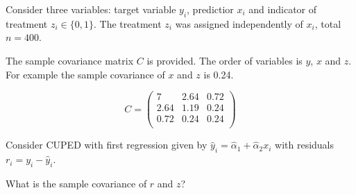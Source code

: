 
\begin{question}
Consider three variables: target variable \(y_i\), predictior \(x_i\) and indicator of treatment \(z_i \in \{0,1\}\).
The treatment \(z_i\) was assigned independently of \(x_i\), total \(n=400\).

The sample covariance matrix \(C\) is provided.
The order of variables is \(y\), \(x\) and \(z\).
For example the sample covariance of \(x\) and \(z\) is 0.24.

\[
C = \begin{pmatrix}
        7 & 2.64 & 0.72 \\
        2.64 & 1.19 & 0.24 \\
        0.72 & 0.24 & 0.24 \\
\end{pmatrix}    
\]

Consider CUPED with first regression given by \(\hat y_i = \hat\alpha_1 + \hat\alpha_2 x_i\) with residuals \(r_i = y_i - \hat y_i\).

What is the sample covariance of \(r\) and \(z\)?
\end{question}


